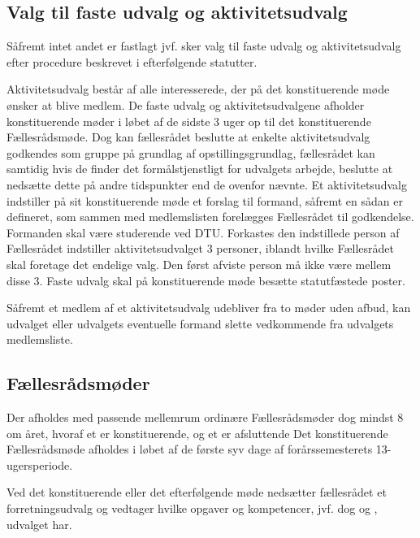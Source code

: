 \begin{list}
\subsection{Valg til faste udvalg og aktivitetsudvalg} \label{kap:ValgTilUdvalg}
\item Såfremt intet andet er fastlagt jvf.  sker valg til faste udvalg og aktivitetsudvalg efter procedure beskrevet i efterfølgende statutter.\\

\item Aktivitetsudvalg består af alle interesserede, der på det konstituerende møde ønsker at blive medlem. De faste udvalg og aktivitetsudvalgene afholder konstituerende møder i løbet af de sidste 3 uger op til det konstituerende Fællesrådsmøde. Dog kan fællesrådet beslutte at enkelte aktivitetsudvalg godkendes som gruppe på grundlag af opstillingsgrundlag, fællesrådet kan samtidig hvis de finder det formålstjenstligt for udvalgets arbejde, beslutte at nedsætte dette på andre tidspunkter end de ovenfor nævnte. Et aktivitetsudvalg indstiller på sit konstituerende møde et forslag til formand, såfremt en sådan er defineret, som sammen med medlemslisten forelægges Fællesrådet til godkendelse. Formanden skal være studerende ved DTU. Forkastes den indstillede person af Fællesrådet indstiller aktivitetsudvalget 3 personer, iblandt hvilke Fællesrådet skal foretage det endelige valg. Den først afviste person må ikke være mellem disse 3. Faste udvalg skal på konstituerende møde besætte statutfæstede poster.

\item  Såfremt et medlem af et aktivitetsudvalg udebliver fra to møder uden afbud, kan udvalget eller udvalgets eventuelle formand slette vedkommende fra udvalgets medlemsliste.


\subsection{Fællesrådsmøder}
\label{S:kap:FRmoeder}
\item Der afholdes med passende mellemrum ordinære Fællesrådsmøder dog mindst 8 om året, hvoraf et er konstituerende, og et er afsluttende Det konstituerende Fællesrådsmøde afholdes i løbet af de første syv dage af forårssemesterets 13-ugersperiode.

\item  Ved det konstituerende eller det efterfølgende møde nedsætter fællesrådet et forretningsudvalg og vedtager hvilke opgaver og kompetencer, jvf. dog  og , udvalget har.


\end{list}
